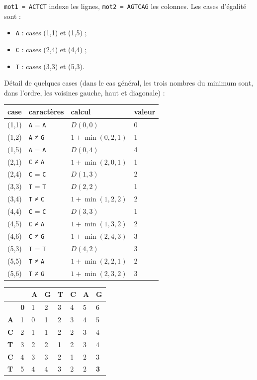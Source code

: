 \documentclass[11pt,a4paper]{article}
\providecommand{\tightlist}{\setlength{\itemsep}{0pt}\setlength{\parskip}{0pt}}
\begin{document}
\texttt{mot1\ =\ \textquotesingle{}ACTCT\textquotesingle{}} indexe les lignes, \texttt{mot2\ =\ \textquotesingle{}AGTCAG\textquotesingle{}} les colonnes. Les cases d'égalité sont :

\begin{itemize}
\tightlist
\item
  \texttt{A} : cases (1,1) et (1,5) ;
\item
  \texttt{C} : cases (2,4) et (4,4) ;
\item
  \texttt{T} : cases (3,3) et (5,3).
\end{itemize}

Détail de quelques cases (dans le cas général, les trois nombres du minimum sont, dans l'ordre, les voisines gauche, haut et diagonale) :

\begin{longtable}[]{@{}llll@{}}
\toprule\noalign{}
case & caractères & calcul & valeur \\
\midrule\noalign{}
\endhead
\bottomrule\noalign{}
\endlastfoot
(1,1) & \texttt{A} = \texttt{A} & \(D(0,0)\) & 0 \\
(1,2) & \texttt{A} ≠ \texttt{G} & \(1+\min(0,2,1)\) & 1 \\
(1,5) & \texttt{A} = \texttt{A} & \(D(0,4)\) & 4 \\
(2,1) & \texttt{C} ≠ \texttt{A} & \(1+\min(2,0,1)\) & 1 \\
(2,4) & \texttt{C} = \texttt{C} & \(D(1,3)\) & 2 \\
(3,3) & \texttt{T} = \texttt{T} & \(D(2,2)\) & 1 \\
(3,4) & \texttt{T} ≠ \texttt{C} & \(1+\min(1,2,2)\) & 2 \\
(4,4) & \texttt{C} = \texttt{C} & \(D(3,3)\) & 1 \\
(4,5) & \texttt{C} ≠ \texttt{A} & \(1+\min(1,3,2)\) & 2 \\
(4,6) & \texttt{C} ≠ \texttt{G} & \(1+\min(2,4,3)\) & 3 \\
(5,3) & \texttt{T} = \texttt{T} & \(D(4,2)\) & 3 \\
(5,5) & \texttt{T} ≠ \texttt{A} & \(1+\min(2,2,1)\) & 2 \\
(5,6) & \texttt{T} ≠ \texttt{G} & \(1+\min(2,3,2)\) & 3 \\
\end{longtable}

\begin{longtable}[]{@{}llllllll@{}}
\toprule\noalign{}
& & A & G & T & C & A & G \\
\midrule\noalign{}
\endhead
\bottomrule\noalign{}
\endlastfoot
& \textbf{0} & 1 & 2 & 3 & 4 & 5 & 6 \\
\textbf{A} & 1 & 0 & 1 & 2 & 3 & 4 & 5 \\
\textbf{C} & 2 & 1 & 1 & 2 & 2 & 3 & 4 \\
\textbf{T} & 3 & 2 & 2 & 1 & 2 & 3 & 4 \\
\textbf{C} & 4 & 3 & 3 & 2 & 1 & 2 & 3 \\
\textbf{T} & 5 & 4 & 4 & 3 & 2 & 2 & \textbf{3} \\
\end{longtable}
\end{document}

